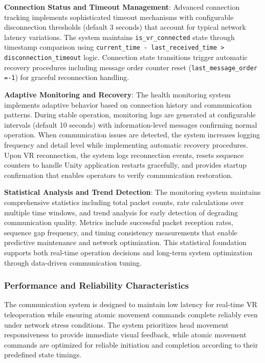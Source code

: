 \textbf{Connection Status and Timeout Management}: Advanced connection tracking implements sophisticated timeout mechanisms with configurable disconnection thresholds (default 3 seconds) that account for typical network latency variations. The system maintains \texttt{is\_vr\_connected} state through timestamp comparison using \texttt{current\_time - last\_received\_time > disconnection\_timeout} logic. Connection state transitions trigger automatic recovery procedures including message order counter reset (\texttt{last\_messa}\linebreak\texttt{ge\_order =-1}) for graceful reconnection handling.

\textbf{Adaptive Monitoring and Recovery}: The health monitoring system implements adaptive behavior based on connection history and communication patterns. During stable operation, monitoring logs are generated at configurable intervals (default 10 seconds) with information-level messages confirming normal operation. When communication issues are detected, the system increases logging frequency and detail level while implementing automatic recovery procedures. Upon VR reconnection, the system logs reconnection events, resets sequence counters to handle Unity application restarts gracefully, and provides startup confirmation that enables operators to verify communication restoration.

\textbf{Statistical Analysis and Trend Detection}: The monitoring system maintains comprehensive statistics including total packet counts, rate calculations over multiple time windows, and trend analysis for early detection of degrading communication quality. Metrics include successful packet reception rates, sequence gap frequency, and timing consistency measurements that enable predictive maintenance and network optimization. This statistical foundation supports both real-time operation decisions and long-term system optimization through data-driven communication tuning.

\subsubsection{Performance and Reliability Characteristics}
The communication system is designed to maintain low latency for real-time VR teleoperation while ensuring atomic movement commands complete reliably even under network stress conditions. The system prioritizes head movement responsiveness to provide immediate visual feedback, while atomic movement commands are optimized for reliable initiation and completion according to their predefined state timings. 

